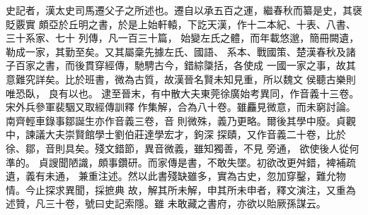 %
%
%


史記者，漢太史司馬遷父子之所述也。遷自以承五百之運，繼春秋而纂是史，其襃貶覈實
頗亞於丘明之書，於是上始軒轅，下訖天漢，作十二本紀、十表、八書、三十系家、七十
列傳，凡一百三十篇，
%
%
%
始變左氏之體，而年載悠邈，簡冊闕遺，勒成一家，其勤至矣。又其屬稾先據左氏、國語、
系本、戰國策、楚漢春秋及諸子百家之書，而後貫穿經傳，馳騁古今，錯綜櫽括，各使成
一國一家之事，故其意難究詳矣。比於班書，微為古質，故漢晉名賢未知見重，所以魏文
侯聽古樂則唯恐臥，
%
%
良有以也。
%
\parswitch
%
逮至晉末，有中散大夫東莞徐廣始考異同，作音義十三卷。宋外兵參軍裴駰又取經傳訓釋
作集解，合為八十卷。雖麤見微意，而未窮討論。南齊輕車錄事鄒誕生亦作音義三卷，音
則微殊，義乃更略。爾後其學中廢。貞觀中，諫議大夫崇賢館學士劉伯莊達學宏才，鉤深
探賾，又作音義二十卷，比於徐、鄒，音則具矣。殘文錯節，異音微義，雖知獨善，不見
旁通，
%
%
%
欲使後人從何準的。
%
\parswitch
%
貞謏聞陋識，頗事鑽研。而家傳是書，不敢失墜。初欲改更舛錯，裨補疏遺，義有未通，
兼重注述。然以此書殘缺雖多，實為古史，忽加穿鑿，難允物情。今止探求異聞，採摭典
%
故，解其所未解，申其所未申者，釋文演注，又重為述贊，凡三十卷，號曰史記索隱。雖
未敢藏之書府，亦欲以貽厥孫謀云。
%
%

